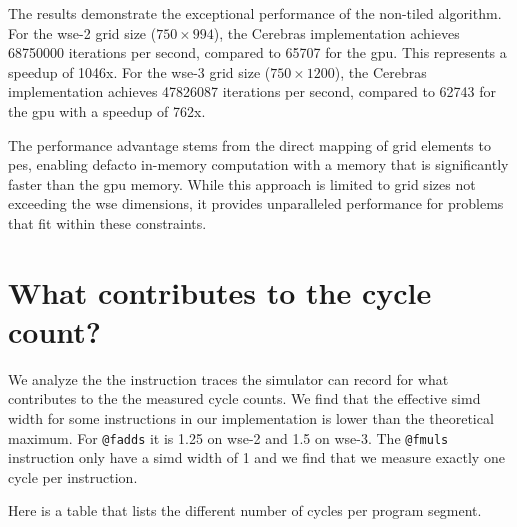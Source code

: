 The results demonstrate the exceptional performance of the non-tiled algorithm. For the \ac{wse}-2 grid size ($750 \times 994$), the Cerebras implementation achieves \num{68750000} iterations per second, compared to \num{65707} for the \ac{gpu}. This represents a speedup of 1046x.
For the \ac{wse}-3 grid size ($750 \times 1200$), the Cerebras implementation achieves \num{47826087} iterations per second, compared to \num{62743} for the \ac{gpu} with a speedup of 762x.

The performance advantage stems from the direct mapping of grid elements to \acp{pe}, enabling defacto in-memory computation with a memory that is significantly faster than the \ac{gpu} memory. While this approach is limited to grid sizes not exceeding the \ac{wse} dimensions, it provides unparalleled performance for problems that fit within these constraints.

\section{What contributes to the cycle count?}
We analyze the the instruction traces the simulator can record for what contributes to the the measured cycle counts.
We find that the effective simd width for some instructions in our implementation is lower than the theoretical maximum.
For \texttt{@fadds} it is 1.25 on wse-2 and 1.5 on wse-3.
The \texttt{@fmuls} instruction only have a simd width of 1 and we find that we measure exactly one cycle per instruction.

Here is a table that lists the different number of cycles per program segment. 